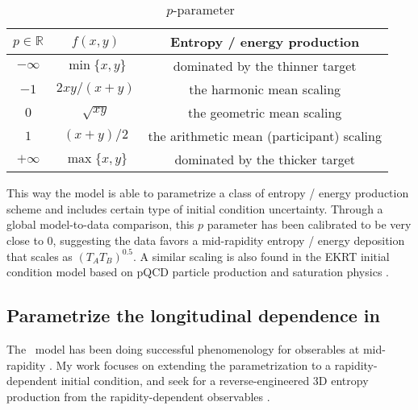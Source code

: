 \begin{table}
\centering
\caption{\trento\ $p$-parameter}\label{tab:trento-p}
\begin{tabular}{ccc}
\hline
$p\in \mathbb{R}$ & $f(x, y)$ & Entropy / energy production\\
\hline
$-\infty$ & $\min\{x, y\}$ &  dominated by the thinner target\\
$-1$ & $2xy/(x+y)$ &   the harmonic mean scaling\\
$0$ & $\sqrt{xy}$ &  the geometric mean scaling\\
$1$ & $(x+y)/2$ &  the arithmetic mean (participant) scaling\\
$+\infty$ & $\max\{x, y\}$ &  dominated by the thicker target \\
\hline
\end{tabular}
\end{table}
This way the model is able to parametrize a class of entropy / energy production scheme and includes certain type of initial condition uncertainty.
Through a global model-to-data comparison, this $p$ parameter has been calibrated to be very close to 0, suggesting the data favors a mid-rapidity entropy / energy deposition that scales as $(T_A T_B)^{0.5}$.
A similar scaling is also found in the EKRT initial condition model based on pQCD particle production and saturation physics \cite{Eskola:1999fc}.

\subsection{Parametrize the longitudinal dependence in \trento}
The \trento\ model has been doing successful phenomenology for obserables at mid-rapidity \cite{Moreland:2014oya,Bernhard:2016tnd,Moreland:2018gsh}.
My work focuses on extending the parametrization to a rapidity-dependent initial condition, and seek for a reverse-engineered 3D entropy production from the rapidity-dependent observables \cite{PhysRevC.96.044912}.

